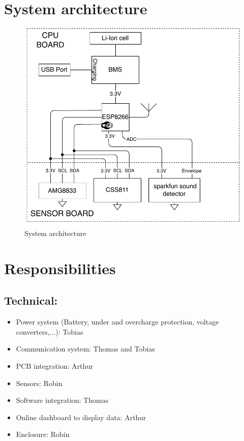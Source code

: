 \documentclass[11pt,a4paper]{article}
\begin{document}
	\section{System architecture}
	\begin{figure}[!ht]
		\centering
		\includegraphics[width=1\linewidth]{architecture.pdf}
		\caption{System architecture}
		\label{fig:architecture}
	\end{figure} 

	\section{Responsibilities}
	\subsection{Technical:}
	\begin{itemize}
		\item Power system (Battery, under and overcharge protection, voltage converters,...): Tobias
		\item Communication system: Thomas and Tobias
		\item PCB integration: Arthur
		\item Sensors: Robin
		\item Software integration: Thomas
		\item Online dashboard to display data: Arthur
		\item Enclosure: Robin
	\end{itemize}
\end{document}

